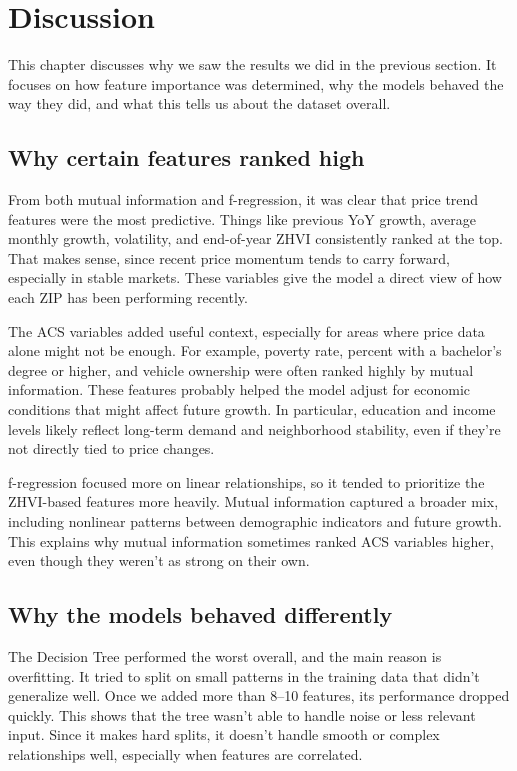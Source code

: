 \chapter{Discussion}
\label{ch:discussion}

This chapter discusses why we saw the results we did in the previous section. It focuses on how feature importance was determined, why the models behaved the way they did, and what this tells us about the dataset overall.

\section{Why certain features ranked high}

From both mutual information and f-regression, it was clear that price trend features were the most predictive. Things like previous YoY growth, average monthly growth, volatility, and end-of-year ZHVI consistently ranked at the top. That makes sense, since recent price momentum tends to carry forward, especially in stable markets. These variables give the model a direct view of how each ZIP has been performing recently.

The ACS variables added useful context, especially for areas where price data alone might not be enough. For example, poverty rate, percent with a bachelor's degree or higher, and vehicle ownership were often ranked highly by mutual information. These features probably helped the model adjust for economic conditions that might affect future growth. In particular, education and income levels likely reflect long-term demand and neighborhood stability, even if they're not directly tied to price changes.

f-regression focused more on linear relationships, so it tended to prioritize the ZHVI-based features more heavily. Mutual information captured a broader mix, including nonlinear patterns between demographic indicators and future growth. This explains why mutual information sometimes ranked ACS variables higher, even though they weren't as strong on their own.

\section{Why the models behaved differently}

The Decision Tree performed the worst overall, and the main reason is overfitting. It tried to split on small patterns in the training data that didn’t generalize well. Once we added more than 8–10 features, its performance dropped quickly. This shows that the tree wasn’t able to handle noise or less relevant input. Since it makes hard splits, it doesn’t handle smooth or complex relationships well, especially when features are correlated.


